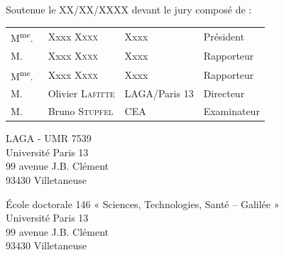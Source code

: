 \begin{titlepage}
\begin{center}

{\Large Soutenue le XX/XX/XXXX devant le jury composé de :}

{\Large
\begin{tabular}{l@{\hskip 0cm}lll}
M\textsuperscript{me}.~&Xxxx \textsc{Xxxx} & Xxxx & Président\\
M.&Xxxx \textsc{Xxxx} & Xxxx & Rapporteur\\
M\textsuperscript{me}.&Xxxx \textsc{Xxxx} & Xxxx & Rapporteur\\
M.&Olivier \textsc{Lafitte} & LAGA/Paris 13 & Directeur\\
M.~&Bruno \textsc{Stupfel} & CEA & Examinateur\\
\end{tabular}
}

\end{center}

\newpage
\thispagestyle{empty}
\vspace*{\fill}

\noindent
\begin{center}
\begin{minipage}[t]{0.5\textwidth}
LAGA - UMR 7539\\
Université Paris 13\\
99 avenue J.B. Clément\\
93430 Villetaneuse
\end{minipage}%
%
\hfill%
%
\begin{minipage}[t]{0.5\textwidth}
École doctorale 146 « Sciences, Technologies, Santé – Galilée »\\
Université Paris 13\\
99 avenue J.B. Clément\\
93430 Villetaneuse
\end{minipage}
\end{center}



\end{titlepage}
\hypersetup{pageanchor=true}
\cleardoublepage